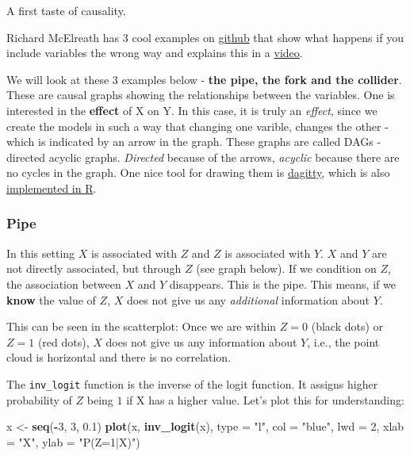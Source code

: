 \documentclass[
]{book}
\newenvironment{Shaded}{\begin{snugshade}}{\end{snugshade}}
\newcommand{\AttributeTok}[1]{\textcolor[rgb]{0.13,0.29,0.53}{#1}}
\newcommand{\DecValTok}[1]{\textcolor[rgb]{0.00,0.00,0.81}{#1}}
\newcommand{\FloatTok}[1]{\textcolor[rgb]{0.00,0.00,0.81}{#1}}
\newcommand{\FunctionTok}[1]{\textcolor[rgb]{0.13,0.29,0.53}{\textbf{#1}}}
\newcommand{\NormalTok}[1]{#1}
\newcommand{\OtherTok}[1]{\textcolor[rgb]{0.56,0.35,0.01}{#1}}
\newcommand{\SpecialCharTok}[1]{\textcolor[rgb]{0.81,0.36,0.00}{\textbf{#1}}}
\newcommand{\StringTok}[1]{\textcolor[rgb]{0.31,0.60,0.02}{#1}}
\begin{document}
A first taste of causality.

Richard McElreath has 3 cool examples on
\href{https://github.com/rmcelreath/causal_salad_2021/blob/main/1_causal_salad.r}{github}
that show what happens if you include variables the wrong way and explains this in a
\href{https://www.youtube.com/watch?v=KNPYUVmY3NM&ab_channel=RichardMcElreath}{video}.

We will look at these 3 examples below - \textbf{the pipe, the fork and the collider}. These are causal graphs showing the
relationships between the variables. One is interested in the \textbf{effect} of X on Y.
In this case, it is truly an \emph{effect}, since we create the models in such a way that changing
one varible, changes the other - which is indicated by an arrow in the graph.
These graphs are called DAGs - directed acyclic graphs. \emph{Directed} because of the arrows,
\emph{acyclic} because there are no cycles in the graph. One nice tool for drawing them is
\href{https://www.dagitty.net/}{dagitty}, which is also \href{https://cran.r-project.org/web/packages/dagitty/index.html}{implemented in R}.

\subsubsection{Pipe}\label{pipe}

In this setting \(X\) is associated with \(Z\) and \(Z\) is associated with \(Y\).
\(X\) and \(Y\) are not directly associated, but through \(Z\) (see graph below).
If we condition on \(Z\), the association between \(X\) and \(Y\) disappears. This is the pipe.
This means, if we \textbf{know} the value of \(Z\), \(X\) does not give us any \emph{additional} information about \(Y\).

This can be seen in the scatterplot: Once we are within \(Z=0\) (black dots) or \(Z=1\) (red dots),
\(X\) does not give us any information about \(Y\),
i.e., the point cloud is horizontal and there is no correlation.

The \texttt{inv\_logit} function is the inverse of the logit function.
It assigns higher probability of \(Z\) being \(1\) if X has a higher value.
Let's plot this for understanding:

\begin{Shaded}
\begin{Highlighting}[]
\NormalTok{x }\OtherTok{\textless{}{-}} \FunctionTok{seq}\NormalTok{(}\SpecialCharTok{{-}}\DecValTok{3}\NormalTok{, }\DecValTok{3}\NormalTok{, }\FloatTok{0.1}\NormalTok{)}
\FunctionTok{plot}\NormalTok{(x, }\FunctionTok{inv\_logit}\NormalTok{(x), }\AttributeTok{type =} \StringTok{"l"}\NormalTok{, }\AttributeTok{col =} \StringTok{"blue"}\NormalTok{, }\AttributeTok{lwd =} \DecValTok{2}\NormalTok{, }\AttributeTok{xlab =} \StringTok{"X"}\NormalTok{, }\AttributeTok{ylab =} \StringTok{"P(Z=1|X)"}\NormalTok{)}
\end{Highlighting}
\end{Shaded}
\end{document}
